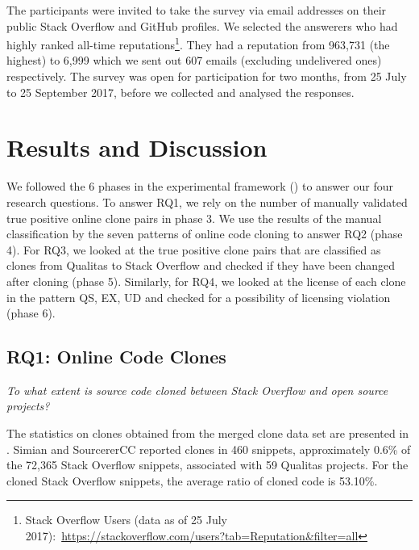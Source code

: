 \documentclass[10pt,journal,compsoc]{IEEEtran}
\begin{document}
The participants were invited to take the survey via email addresses on their
public Stack Overflow and GitHub profiles. We selected the answerers who had highly
ranked all-time reputations\footnote{Stack Overflow Users (data as of 25 July
	2017):~\url{https://stackoverflow.com/users?tab=Reputation&filter=all}}.
They had a reputation from 963,731 (the
highest) to 6,999 which
we sent out 607 emails (excluding undelivered ones) respectively. The
survey was open for participation for two months, from 25 July to 25 September
2017, before we collected and analysed the responses.

\section{Results and Discussion}

We followed the 6 phases in the experimental framework ()
to answer our four research questions. 
To answer RQ1, we rely on the number of manually validated true positive online clone pairs
in phase 3. We use the results of the manual classification by the
seven patterns of online code cloning to answer RQ2 (phase 4). 
For RQ3, we looked at the true positive clone pairs that are classified 
as clones from Qualitas to Stack Overflow and
checked if they have been changed after cloning (phase 5). Similarly, for RQ4, we looked at the license of each clone in the pattern 
QS, EX, UD and checked for a possibility of licensing violation (phase 6).

\subsection{RQ1: Online Code Clones} 
\vspace{0.25cm}
\textit{To what extent is source
	code cloned between Stack Overflow and open source projects?}
\vspace{0.25cm}

The statistics on clones obtained from the merged clone data set are
presented in . Simian and SourcererCC
reported clones in 460 snippets, approximately 0.6\% of the
72,365 Stack Overflow snippets, associated with 59 Qualitas
projects. For the cloned Stack Overflow snippets, the
average ratio of cloned code is 53.10\%.
\end{document}
